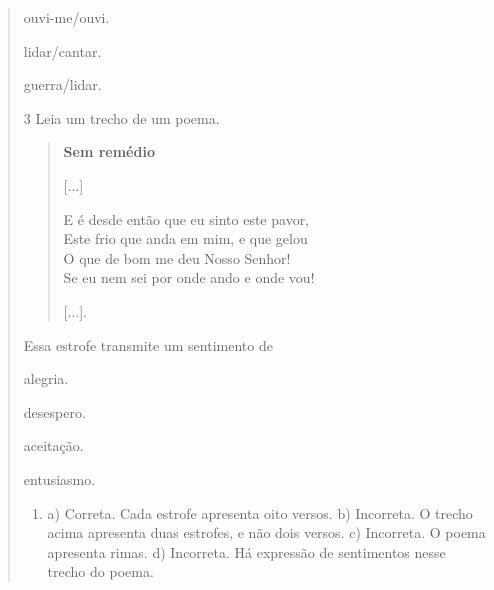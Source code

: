 \begin{quote}
\begin{minipage}{.5\textwidth}
\begin{escolha}
\item ouvi-me/ouvi.

\item lidar/cantar.

\item guerra/lidar.
\end{escolha}
\end{minipage}

\num{3} Leia um trecho de um poema.

\begin{verse}
\textbf{Sem remédio}

{[}...{]}

E é desde então que eu sinto este pavor,\\
Este frio que anda em mim, e que gelou\\
O que de bom me deu Nosso Senhor!\\
Se eu nem sei por onde ando e onde vou!

{[}...{]}.

\end{verse}

Essa estrofe transmite um sentimento de

\begin{minipage}{.5\textwidth}
\begin{escolha}
\item alegria.

\item desespero.

\item aceitação.

\item entusiasmo.
\end{escolha}
\end{minipage}


\begin{enumerate}
\item
a) Correta. Cada estrofe apresenta oito versos.
b) Incorreta. O trecho acima apresenta duas estrofes, e não dois versos.
c) Incorreta. O poema apresenta rimas.
d) Incorreta. Há expressão de sentimentos nesse trecho do poema.


\end{enumerate}
\end{quote}
